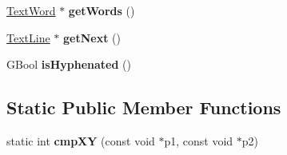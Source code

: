 \begin{DoxyCompactItemize}
\item 
\mbox{\label{class_text_line_a55c2edd365e894b2faab10bcd2fee139}} 
\hyperlink{class_text_word}{Text\+Word} $\ast$ {\bfseries get\+Words} ()
\item 
\mbox{\label{class_text_line_ae7d9d03779e3693983731ed0bad3288a}} 
\hyperlink{class_text_line}{Text\+Line} $\ast$ {\bfseries get\+Next} ()
\item 
\mbox{\label{class_text_line_a2e8bfc2824631ca9a646f5489ad3efd9}} 
G\+Bool {\bfseries is\+Hyphenated} ()
\end{DoxyCompactItemize}
\subsection*{Static Public Member Functions}
\begin{DoxyCompactItemize}
\item 
\mbox{\label{class_text_line_a1ae7d0377b6211819755086caa70a26a}} 
static int {\bfseries cmp\+XY} (const void $\ast$p1, const void $\ast$p2)
\end{DoxyCompactItemize}
